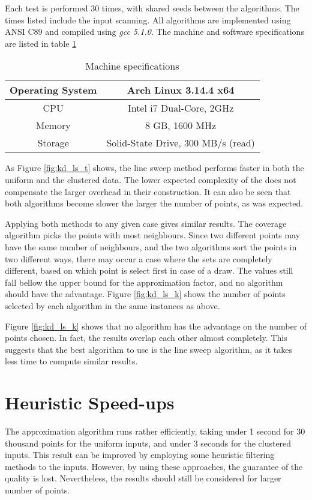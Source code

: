 Each test is performed 30 times, with shared seeds between the algorithms. The times listed include the input scanning. All algorithms are implemented using ANSI C89 and compiled using \emph{gcc 5.1.0}. The machine and software specifications are listed in table \ref{tab:specs2}

\begin{table}[H]
	\begin{center}
		\begin{tabular}{|c|c|}
			\hline
			Operating System  & Arch Linux 3.14.4 x64\\\hline
			CPU & Intel i7 Dual-Core, 2GHz\\\hline
			Memory & 8 GB, 1600 MHz \\\hline
			Storage &  Solid-State Drive, 300 MB/s (read)\\\hline
		\end{tabular}
		\caption{Machine specifications}
		\label{tab:specs2}
	\end{center}
\end{table}



As Figure \ref{fig:kd_ls_t} shows, the line sweep method performs faster in both the uniform and the clustered data. The lower expected complexity of the \kdtrees does not compensate the larger overhead in their construction. It can also be seen that both algorithms become slower the larger the number of points, as was expected.

Applying both methods to any given case gives similar results. The coverage algorithm picks the points with most neighbours. Since two different points may have the same number of neighbours, and the two algorithms sort the points in two different ways, there may occur a case where the sets are completely different, based on which point is select first in case of a draw. The values still fall bellow the upper bound for the approximation factor, and no algorithm should have the advantage. Figure \ref{fig:kd_ls_k} shows the number of points selected by each algorithm in the same instances as above.



Figure \ref{fig:kd_ls_k} shows that no algorithm has the advantage on the number of points chosen. In fact, the results overlap each other almost completely. This suggests that the best algorithm to use is the line sweep algorithm, as it takes less time to compute similar results.

\section{Heuristic Speed-ups}
The approximation algorithm runs rather efficiently, taking under 1 second for 30 thousand points for the uniform inputs, and under 3 seconds for the clustered inputs. This result can be improved by employing some heuristic filtering methods to the inputs. However, by using these approaches, the guarantee of the quality is lost. Nevertheless, the results should still be considered for larger number of points.
